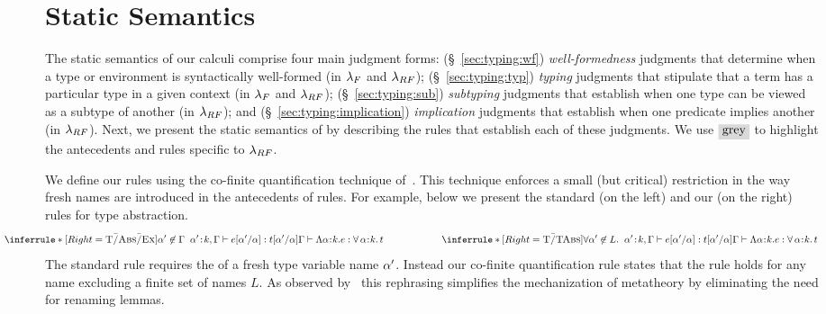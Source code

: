 \section{Static Semantics}
\label{sec:lang:static}

The static semantics of our calculi comprise
four main judgment forms:
%
(\S~\ref{sec:typing:wf}) {\emph{well-formedness}} judgments that determine when a type
or environment is syntactically well-formed (in $\lambda_{F}$ and $\lambda_{RF}$);
%
(\S~\ref{sec:typing:typ}) {\emph{typing}} judgments that stipulate that a term has
a particular type in a given context (in $\lambda_{F}$ and $\lambda_{RF}$);
%
(\S~\ref{sec:typing:sub}) {\emph{subtyping}} judgments that establish when one type can
be viewed as a subtype of another (in $\lambda_{RF}$); and
%
(\S~\ref{sec:typing:implication}) {\emph{implication}} judgments that establish when one predicate
implies another (in $\lambda_{RF}$).
%
Next, we present the static semantics of \sysrf by describing
the rules that establish 
each of these judgments.
%
We use $\greybox{\mbox{grey}}$ to highlight the antecedents and rules
specific to $\lambda_{RF}$.
%

\begin{fullversion}

%
We define our rules using the co-finite quantification technique
of~\citet{AydemirCPPW08}.
%
This technique enforces a small (but critical) restriction
in the way fresh names are introduced in the antecedents of rules.
%
For example, below we present the standard (on the left)
and our (on the right) rules for type abstraction.
$$
\hspace{-0.60in}
\inferrule*[Right=\tAbsEx]
    {\notmem{\al'}{\tcenv} \;\;
      \hastype{\bind{\al'}{\skind},\tcenv}{\subst{\sexpr}{\al}{\al'}}{\subst{\stype}{\al}{\al'}} }
    {\hastype{\tcenv}{\tabs{\al}{\skind}{\sexpr}}{\polytype{\al}{\skind}{\stype}}}
\qquad\qquad\qquad
\inferrule*[Right=\tTAbs]
    {\forall\notmem{\al'}{L}. \;\;
      \hastype{\bind{\al'}{\skind},\tcenv}{\subst{\sexpr}{\al}{\al'}}{\subst{\stype}{\al}{\al'}} }
    {\hastype{\tcenv}{\tabs{\al}{\skind}{\sexpr}}{\polytype{\al}{\skind}{\stype}}}
$$
%
The standard rule \tAbsEx requires the  of a
fresh type variable name $\alpha'$.
%
Instead our co-finite quantification rule
states that the rule holds for any name excluding
a finite set of names $L$. %
%
As observed by~\citet{AydemirCPPW08} this rephrasing
simplifies the mechanization of metatheory
by eliminating the need for renaming lemmas.

\end{fullversion}

